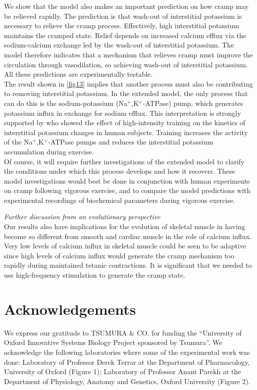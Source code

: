 \documentclass[fleqn,10pt]{physiome}
\begin{document}
We show that the model also makes an important prediction on how cramp may be relieved rapidly. The prediction is that wash-out of interstitial potassium is necessary to relieve the cramp process. Effectively, high interstitial potassium maintains the cramped state. Relief depends on increased calcium efflux via the sodium-calcium exchange led by the wash-out of interstitial potassium. The model therefore indicates that a mechanism that relieves cramp must improve the circulation through vasodilation, so achieving wash-out of interstitial potassium. All these predictions are experimentally testable.\\\newline
The result shown in \autoref{fig13} implies that another process must also be contributing to removing interstitial potassium. In the extended model, the only process that can do this is the sodium-potassium (Na$^+$,K$^+$-ATPase) pump, which generates potassium influx in exchange for sodium efflux. This interpretation is strongly supported by \citet{nielsen2004effects} who showed the effect of high-intensity training on the kinetics of interstitial potassium changes in human subjects. Training increases the activity of the Na$^+$,K$^+$-ATPase pumps and reduces the interstitial potassium accumulation during exercise. \\\newline
Of course, it will require further investigations of the extended model to clarify the conditions under which this process develops and how it recovers. These model investigations would best be done in conjunction with human experiments on cramp following vigorous exercise, and to compare the model predictions with experimental recordings of biochemical parameters during vigorous exercise. \\\newline

\textit{Further discussion from an evolutionary perspective}\\\newline
Our results also have implications for the evolution of skeletal muscle in having become so different from smooth and cardiac muscle in the role of calcium influx. Very low levels of calcium influx in skeletal muscle could be seen to be adaptive since high levels of calcium influx would generate the cramp mechanism too rapidly during maintained tetanic contractions. It is significant that we needed to use high-frequency stimulation to generate the cramp state.\\\newline

\section{Acknowledgements}
We express our gratitude to TSUMURA \& CO. for funding the “University of Oxford Innovative Systems Biology Project sponsored by Tsumura”. We acknowledge the following laboratories where some of the experimental work was done: Laboratory of Professor Derek Terrar at the Department of Pharmacology, University of Oxford (Figure 1); Laboratory of Professor Anant Parekh at the Department of Physiology, Anatomy and Genetics, Oxford University (Figure 2).\newpage


\end{document}
